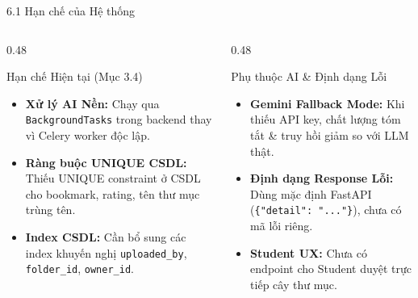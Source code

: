 \documentclass[10pt, aspectratio=169]{beamer}
\begin{document}
\begin{frame}{6.1 Hạn chế của Hệ thống}
    \begin{columns}[T]
        \begin{column}{0.48\textwidth}
            \begin{alertblock}{Hạn chế Hiện tại (Mục 3.4)}
                \begin{itemize}
                    \item \textbf{Xử lý AI Nền:} Chạy qua \texttt{BackgroundTasks} trong backend thay vì Celery worker độc lập.
                    \item \textbf{Ràng buộc UNIQUE CSDL:} Thiếu UNIQUE constraint ở CSDL cho bookmark, rating, tên thư mục trùng tên.
                    \item \textbf{Index CSDL:} Cần bổ sung các index khuyến nghị \texttt{uploaded\_by}, \texttt{folder\_id}, \texttt{owner\_id}.
                \end{itemize}
            \end{alertblock}
        \end{column}

        \begin{column}{0.48\textwidth}
            \begin{alertblock}{Phụ thuộc AI \& Định dạng Lỗi}
                \begin{itemize}
                    \item \textbf{Gemini Fallback Mode:} Khi thiếu API key, chất lượng tóm tắt \& truy hồi giảm so với LLM thật.
                    \item \textbf{Định dạng Response Lỗi:} Dùng mặc định FastAPI (\texttt{\{"detail": "..."\}}), chưa có mã lỗi riêng.
                    \item \textbf{Student UX:} Chưa có endpoint cho Student duyệt trực tiếp cây thư mục.
                \end{itemize}
            \end{alertblock}
        \end{column}
    \end{columns}
\end{frame}
\end{document}
